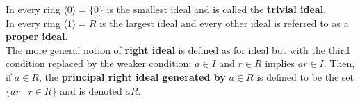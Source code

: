 \documentclass[a4paper]{article}
\begin{document}
\begin{framed}
	\noindent
	In every ring $\langle 0 \rangle = \{ 0 \}$ is the smallest ideal and is called the \textbf{trivial ideal}.\\
	In every ring $\langle 1 \rangle = R$ is the largest ideal and every other ideal is referred to as a \textbf{proper ideal}.\\
	
	\noindent
	The more general notion of \textbf{right ideal} is defined as for ideal but with the third condition replaced by the weaker condition: $a \in I$ and $r \in R$ implies $ar \in I$. Then, if $a \in R$, the \textbf{principal right ideal generated by} $a \in R$ is defined to be the set $\{ar \; \vert \; r \in R\}$ and is denoted $aR$.
\end{framed}
\end{document}
